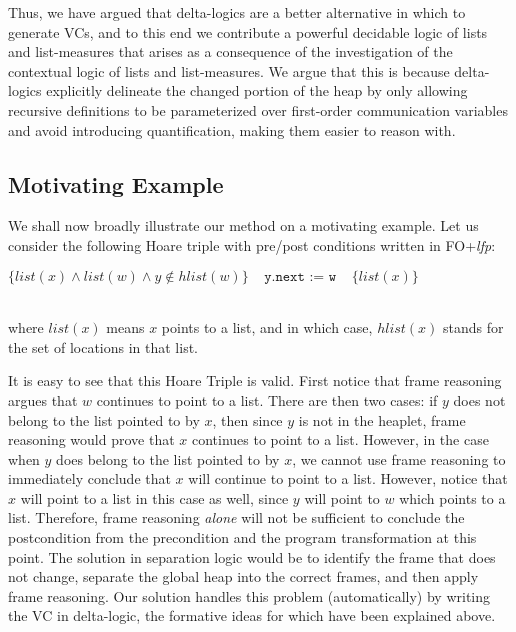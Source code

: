 \documentclass[acmsmall,review,anonymous]{acmart}\settopmatter{printfolios=true,printccs=false,printacmref=false}
\begin{document}
Thus, we have argued that delta-logics are a better alternative in which to generate VCs, and to this end we contribute a powerful decidable logic of lists and list-measures that arises as a consequence of the investigation of the contextual logic of lists and list-measures. We argue that this is because delta-logics explicitly delineate the changed portion of the heap by only allowing recursive definitions to be parameterized over first-order communication variables and avoid introducing quantification, making them easier to reason with.


\subsection{Motivating Example}
We shall now broadly illustrate our method on a motivating example.
Let us consider the following Hoare triple with pre/post conditions written in FO+\textit{lfp}:\\
\centerline{$ \{ list(x) \wedge  list(w) \wedge  y \not \in hlist(w) \} 
~~~~~\texttt{y.next := w}~~~~~
\{list(x) \}$}\\
where $list(x)$ means $x$ points to a list, and in which
case, $hlist(x)$ stands for the set of locations in that list.

It is easy to see that this Hoare Triple is valid. First notice that frame reasoning argues that $w$ continues to point to a list.
There are then two cases: if $y$ does not belong to the list pointed to by $x$, then since $y$ is not in the heaplet, frame reasoning would prove that $x$ continues to point to a list.
However, in the case when $y$ does belong to the list pointed to by $x$, we cannot use frame reasoning to immediately conclude that $x$ will continue to point to a list. However, notice that $x$ will point to a list in this case as well, since $y$ will point to $w$ which points to a list. Therefore, frame reasoning \emph{alone} will not be sufficient to conclude the postcondition from the precondition and the program transformation at this point. The solution in separation logic would be to identify the frame that does not change, separate the global heap into the correct frames, and then apply frame reasoning. Our solution handles this problem (automatically) by writing the VC in delta-logic, the formative ideas for which have been explained above.
\end{document}
